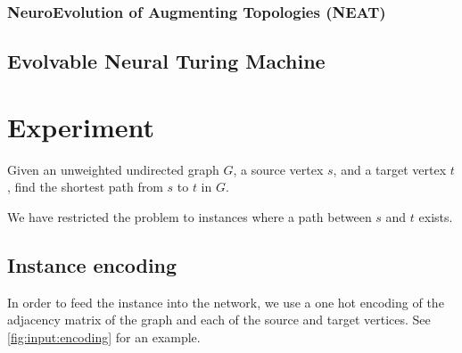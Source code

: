 \documentclass{article}
\begin{document}
\subsubsection{NeuroEvolution of Augmenting Topologies (NEAT)}

\subsection{Evolvable Neural Turing Machine}

\section{Experiment}
Given an unweighted undirected graph $G$, a source vertex $s$, and a target vertex $t$, find the shortest path from $s$ to $t$ in $G$.

We have restricted the problem to instances where a path between $s$ and $t$ exists.

\subsection{Instance encoding}
In order to feed the instance into the network, we use a one hot encoding of the adjacency matrix of the graph and each of the source and target vertices. See \autoref{fig:input:encoding} for an example.
\end{document}
